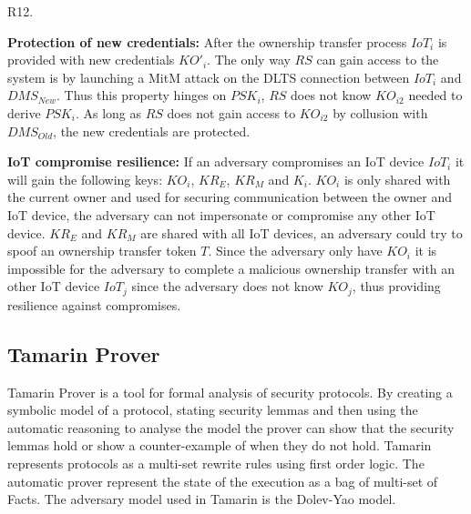 {\begin{labeling}{R12.}
\item [R11.] \textbf{Protection of new credentials:} 
After the ownership transfer process $IoT_i$ is provided with new credentials $KO'_i$. The only way $RS$ can gain access to the system is by launching a MitM attack on the DLTS connection between $IoT_i$ and $DMS_{New}$. Thus this property hinges on $PSK_i$, $RS$ does not know $KO_{i2}$ needed to derive $PSK_i$. As long as $RS$ does not gain access to $KO_{i2}$ by collusion with $DMS_{Old}$, the new credentials are protected.
\item [R12.] \textbf{IoT compromise resilience:} 
If an adversary compromises an IoT device $IoT_i$ it will gain the following keys: $KO_i$, $KR_E$, $KR_M$ and $K_i$. $KO_i$ is only shared with the current owner and used for securing communication between the owner and IoT device, the adversary can not impersonate or compromise any other IoT device. $KR_E$ and $KR_M$ are shared with all IoT devices, an adversary could try to spoof an ownership transfer token $T$. Since the adversary only have $KO_i$ it is impossible for the adversary to complete a malicious ownership transfer with an other IoT device $IoT_j$ since the adversary does not know $KO_j$, thus providing resilience against compromises.
\end{labeling}

\subsection{Tamarin Prover}
\label{sec:ot:Tamarin}
Tamarin Prover is a tool for formal analysis of security protocols. By creating a symbolic model of a protocol, stating security lemmas and then using the automatic reasoning to analyse the model the prover can  show that the security lemmas hold or show a counter-example of when they do not hold.
Tamarin represents protocols as a multi-set rewrite rules using first order logic. The automatic prover represent the state of the execution as a bag of multi-set of Facts. The adversary model used in Tamarin is the Dolev-Yao model. %

}
